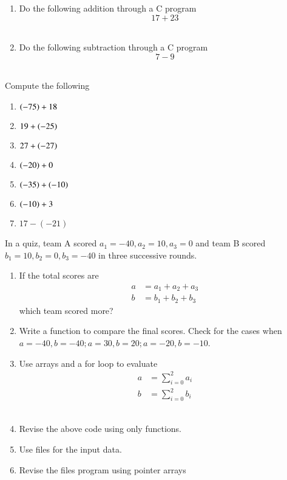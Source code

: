 \begin{enumerate}[label=\thesubsection.\arabic*, ref=\thesubsection.\theenumi]
\item Do the following addition through a C program
	$$17+23$$
	\\
	\solution
	
\item Do the following subtraction through a C program
$$7-9$$
	\\
	\solution
	
\end{enumerate}
Compute the following
\begin{enumerate}[label=\thesubsection.\arabic*, ref=\thesubsection.\theenumi,resume*]
\item $\left(-75\right)+18$
\item $19+\left(-25\right)$
\item $27+\left(-27\right)$
\item $\left(-20\right)+0$
\item $\left(-35\right)+\left(-10\right)$
\item $\left(-10\right)+3$
\item $17-(-21)$
\end{enumerate}
In a quiz, team A scored $a_1 = -40, a_2=10, a_3=0$ and team B scored $b_1=10, b_2=0, b_3=-40$ in three successive rounds.
\begin{enumerate}[label=\thesubsection.\arabic*, ref=\thesubsection.\theenumi,resume*]
\item  If the total scores are 
	\begin{align}
		a &= a_1+a_2+a_3
		\\
		b &= b_1+b_2+b_3
	\end{align}
	which team scored more? 
	\\
	\solution 
	
\item Write a function to compare the final scores.  Check for the cases when $a = -40, b = -40; a = 30, b = 20; a = -20, b = -10$.
	\\
	\solution 
	
\item Use arrays and a for loop to evaluate 
	\begin{align}
		a &= \sum_{i=0}^{2}a_i
		\\
		b &= \sum_{i=0}^{2}b_i
	\end{align}
	\\
	\solution 
	
\item Revise the above code using only functions.
	\\
	\solution 
	
\item Use files for the input data.
	\\
	\solution 
	
\item Revise the files program using pointer arrays
	\\
	\solution 
	
\end{enumerate}
